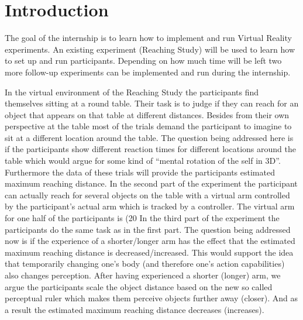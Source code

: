 \section{Introduction} \label{sec:introduction}

The goal of the internship is to learn how to implement and run Virtual Reality experiments. An existing experiment (Reaching Study) will be used to learn how to set up and run participants. Depending on how much time will be left two more follow-up experiments can be implemented and run during the internship.

In the virtual environment of the Reaching Study the participants find themselves sitting at a round table. Their task is to judge if they can reach for an object that appears on that table at different distances. Besides from their own perspective at the table most of the trials demand the participant to imagine to sit at a different location around the table. The question being addressed here is if the participants show different reaction times for different locations around the table which would argue for some kind of “mental rotation of the self in 3D”. Furthermore the data of these trials will provide the participants estimated maximum reaching distance. 
In the second part of the experiment the participant can actually reach for several objects on the table with a virtual arm controlled by the participant’s actual arm which is tracked by a controller. The virtual arm for one half of the participants is (20%
In the third part of the experiment the participants do the same task as in the first part. The question being addressed now is if the experience of a shorter/longer arm has the effect that the estimated maximum reaching distance is decreased/increased. This would support the idea that temporarily changing one’s body (and therefore one’s action capabilities) also changes perception. After having experienced a shorter (longer) arm, we argue the participants scale the object distance based on the new so called perceptual ruler which makes them perceive objects further away (closer). And as a result the estimated maximum reaching distance decreases (increases).